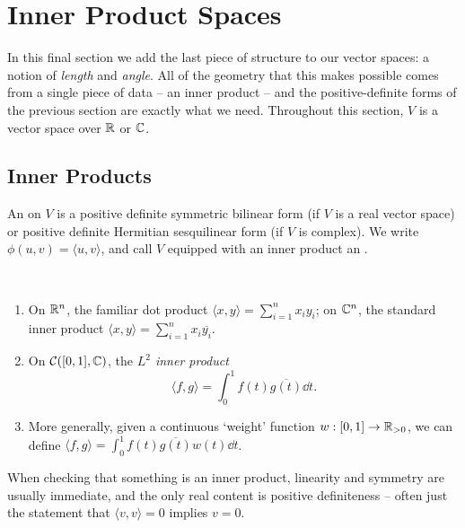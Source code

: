 \documentclass[a4paper]{scrartcl}
\begin{document}
\section{Inner Product Spaces}

In this final section we add the last piece of structure to our vector spaces: a notion of \emph{length} and \emph{angle}. All of the geometry that this makes possible comes from a single piece of data -- an inner product -- and the positive-definite forms of the previous section are exactly what we need. Throughout this section, $V$ is a vector space over $\mathbb{R}$ or $\mathbb{C}$.

\subsection{Inner Products}

\begin{definition}
    An  on $V$ is a positive definite symmetric bilinear form (if $V$ is a real vector space) or positive definite Hermitian sesquilinear form (if $V$ is complex). We write $\phi(u, v) = \langle u, v\rangle$, and call $V$ equipped with an inner product an .
\end{definition}

\begin{example}~
    \vspace{-1.5\baselineskip}
    \begin{enumerate}[label=(\roman*)]
        \item On $\mathbb{R}^n$, the familiar dot product $\langle x, y \rangle = \sum_{i = 1}^n x_i y_i$; on $\mathbb{C}^n$, the standard inner product $\langle x, y \rangle = \sum_{i = 1}^n x_i \overline{y_i}$.
        \item On $\mathcal{C}([0,1], \mathbb{C})$, the \emph{$L^2$ inner product}
        $$
        \langle f, g \rangle = \int_0^1 f(t)\overline{g(t)} \dd t.
        $$
        \item More generally, given a continuous `weight' function $w: [0, 1] \rightarrow \mathbb{R}_{> 0}$, we can define $\langle f, g\rangle = \int_0^1 f(t)\overline{g(t)}w(t) \dd t$.
    \end{enumerate}
\end{example}

When checking that something is an inner product, linearity and symmetry are usually immediate, and the only real content is positive definiteness -- often just the statement that $\langle v, v \rangle = 0$ implies $v = 0$.
\end{document}
